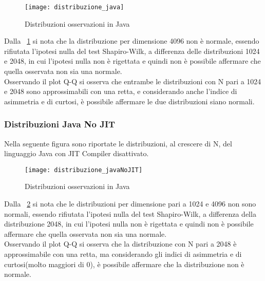 \begin{figure}[!htbp]
  \texttt{[image: distribuzione\_java]}
  \caption{Distribuzioni osservazioni in Java}
  \label{distribuzione_java}
\end{figure}

Dalla \figurename~\ref{distribuzione_java} si nota
che la distribuzione per dimensione 4096 non è normale, essendo rifiutata
l'ipotesi nulla del test Shapiro-Wilk, a differenza delle distribuzioni 1024 e
2048, in cui l'ipotesi nulla non è rigettata e quindi non è possibile affermare
che quella osservata non sia una normale.\\
Osservando il plot Q-Q si osserva che entrambe le distribuzioni con N pari a 1024
e 2048 sono approssimabili con una retta, e considerando anche l'indice di asimmetria
e di curtosi, è possibile affermare le due distribuzioni siano normali.\\

\clearpage
\subsubsection{Distribuzioni Java No JIT}
Nella seguente figura sono riportate le distribuzioni, al crescere di N, del
linguaggio Java con JIT Compiler disattivato.

\begin{figure}[!htbp]
  \texttt{[image: distribuzione\_javaNoJIT]}
  \caption{Distribuzioni osservazioni in Java}
  \label{distribuzione_javaNoJIT}
\end{figure}

Dalla \figurename~\ref{distribuzione_javaNoJIT} si nota
che le distribuzioni per dimensione pari a 1024 e 4096 non sono normali, essendo
rifiutata l'ipotesi nulla del test Shapiro-Wilk, a differenza della distribuzione
2048, in cui l'ipotesi nulla non è rigettata e quindi non è possibile affermare
che quella osservata non sia una normale.\\
Osservando il plot Q-Q si osserva che la distribuzione con N pari a 2048 è
approssimabile con una retta, ma considerando gli indici di asimmetria e di
curtosi(molto maggiori di 0), è possibile affermare che la distribuzione
non è normale.\\

\clearpage
